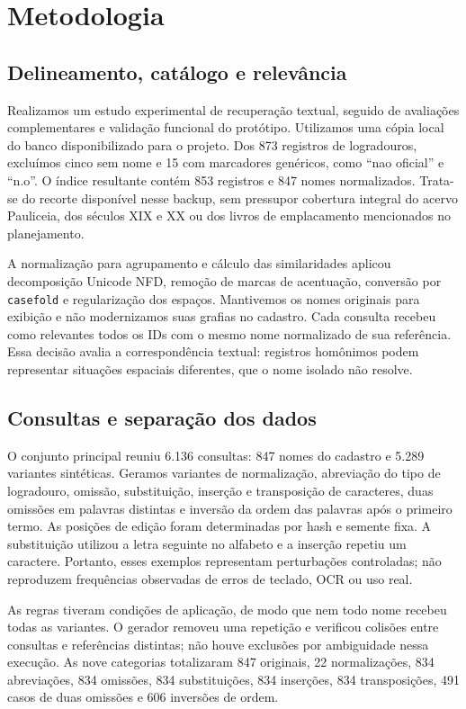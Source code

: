 \section{Metodologia}

\subsection{Delineamento, catálogo e relevância}

Realizamos um estudo experimental de recuperação textual, seguido de avaliações complementares e validação funcional do protótipo. Utilizamos uma cópia local do banco disponibilizado para o projeto. Dos 873 registros de logradouros, excluímos cinco sem nome e 15 com marcadores genéricos, como ``nao oficial'' e ``n.o''. O índice resultante contém 853 registros e 847 nomes normalizados. Trata-se do recorte disponível nesse backup, sem pressupor cobertura integral do acervo Pauliceia, dos séculos XIX e XX ou dos livros de emplacamento mencionados no planejamento.

A normalização para agrupamento e cálculo das similaridades aplicou decomposição Unicode NFD, remoção de marcas de acentuação, conversão por \texttt{casefold} e regularização dos espaços. Mantivemos os nomes originais para exibição e não modernizamos suas grafias no cadastro. Cada consulta recebeu como relevantes todos os IDs com o mesmo nome normalizado de sua referência. Essa decisão avalia a correspondência textual: registros homônimos podem representar situações espaciais diferentes, que o nome isolado não resolve.

\subsection{Consultas e separação dos dados}

O conjunto principal reuniu 6.136 consultas: 847 nomes do cadastro e 5.289 variantes sintéticas. Geramos variantes de normalização, abreviação do tipo de logradouro, omissão, substituição, inserção e transposição de caracteres, duas omissões em palavras distintas e inversão da ordem das palavras após o primeiro termo. As posições de edição foram determinadas por hash e semente fixa. A substituição utilizou a letra seguinte no alfabeto e a inserção repetiu um caractere. Portanto, esses exemplos representam perturbações controladas; não reproduzem frequências observadas de erros de teclado, OCR ou uso real.

As regras tiveram condições de aplicação, de modo que nem todo nome recebeu todas as variantes. O gerador removeu uma repetição e verificou colisões entre consultas e referências distintas; não houve exclusões por ambiguidade nessa execução. As nove categorias totalizaram 847 originais, 22 normalizações, 834 abreviações, 834 omissões, 834 substituições, 834 inserções, 834 transposições, 491 casos de duas omissões e 606 inversões de ordem.

